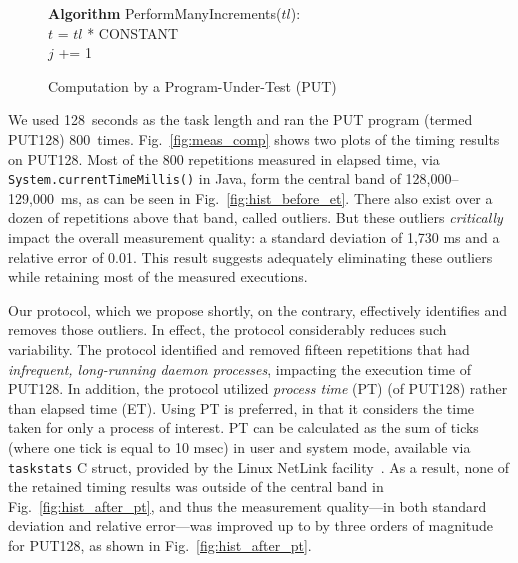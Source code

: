 \documentclass[letter]{ieice}
\begin{document}
\vspace{-.2in}
\begin{figure}[h]
\begin{center}
\begin{algorithmic}
{\bf Algorithm} PerformManyIncrements($tl$): \\
\STATE $t$ = $tl$ * {CONSTANT} \\
		\STATE $j$ += 1 \\
	\ENDFOR 
\ENDFOR 
\end{algorithmic}
\end{center}
\caption{Computation by a Program-Under-Test (PUT)\label{alg:put}}
\vspace{-.2in}
\end{figure}

We used 128~seconds as the task length and ran the PUT program (termed PUT128) 
800~times. 
{\color{blue}Fig.~\ref{fig:meas_comp} shows two plots of the timing results on PUT128.
Most of the 800 repetitions measured in elapsed time, 
via  {\tt System.currentTimeMillis()} in Java, form the central band 
of \hbox{128,000--129,000 ms,} as can be seen in Fig.~\ref{fig:hist_before_et}. 
There also exist over a dozen of repetitions above that band, called outliers.
But these outliers {\em critically} impact the overall measurement quality: 
a standard deviation of 1,730 ms and a relative error of 0.01.
This result suggests adequately eliminating these outliers 
while retaining most of the measured executions.}

{\color{blue}
Our protocol, which we propose shortly, on the contrary, 
effectively identifies and removes those outliers. 
In effect, the protocol considerably reduces such variability.
The protocol identified and removed fifteen repetitions 
that had {\em infrequent, \hbox{long-running} daemon processes}, 
impacting the execution time of PUT128. 
In addition, the protocol utilized {\em process time} (PT) (of PUT128) 
rather than elapsed time (ET). 
Using PT is preferred, in that it considers 
the time taken for only a process of interest.
PT can be calculated as the sum of ticks (where one tick is equal to 10 msec)
in user and system mode, available via {\tt taskstats} C struct, 
provided by the Linux NetLink facility~\cite{Netlink}.
As a result, none of the retained timing results was outside of 
the central band in Fig.~\ref{fig:hist_after_pt}, and thus 
the measurement quality---in both standard deviation and relative error---was 
improved up to by three orders of magnitude for PUT128, 
as shown in Fig.~\ref{fig:hist_after_pt}.
}
\end{document}
